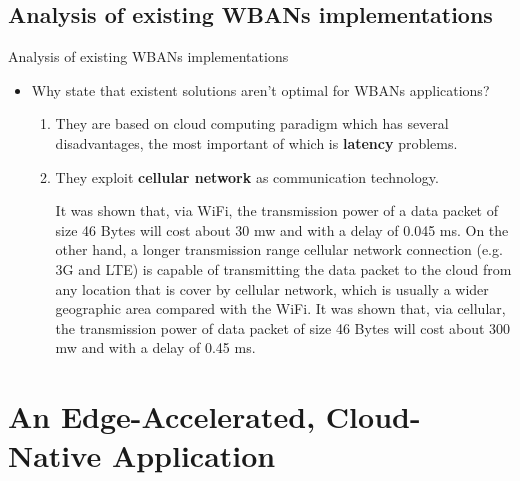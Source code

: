 \documentclass[10pt]{beamer}
\begin{document}
\subsection{Analysis of existing WBANs implementations}
\begin{frame}{Analysis of existing WBANs implementations} 

\begin{itemize}
\item Why \citet{MSAReport} state that existent solutions aren't optimal for WBANs applications?

\begin{enumerate}
\item They are based on cloud computing paradigm which has several disadvantages, the most important of which is \textbf{latency} problems. 
\item They exploit \textbf{cellular network} as communication technology.

\begin{quoting}[font=itshape, begintext={``}, endtext={''\cite[par.~3.1]{MSAReport}}]
It was shown that, via WiFi, the transmission power of a data packet of size 46 Bytes will cost about 30 mw and with a delay of 0.045 ms. On the other hand, a longer transmission range cellular network connection (e.g. 3G and LTE) is capable of transmitting the data packet to the cloud from any location that is cover by cellular network, which is usually a wider geographic area compared with the WiFi. It was shown that, via cellular, the transmission power of data packet of size 46 Bytes will cost about 300 mw and with a delay of 0.45 ms.
\end{quoting}

\end{enumerate}

\end{itemize}

\end{frame} 
\section{An Edge-Accelerated, Cloud-Native Application}
\end{document}
